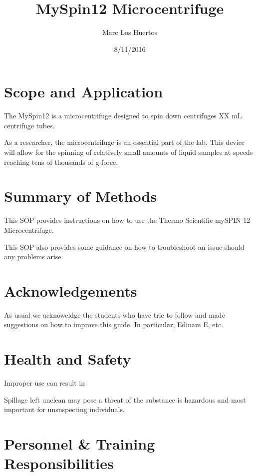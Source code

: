\documentclass[12pt]{../SOP3_beta}
\title{MySpin12 Microcentrifuge}
\date{8/11/2016}
\author{Marc Los Huertos}
\begin{document}


\maketitle

\section{Scope and Application}

\NP The MySpin12 is a microcentrifuge designed to spin down centrifuges XX mL centrifuge tubes.

\NP As a researcher, the microcentrifuge is an essential part of the lab. This device will allow for the spinning of relatively small amounts of liquid samples at speeds reaching tens of thousands of g-force. 

\section{Summary of Methods}

\NP This SOP provides instructions on how to use the Thermo Scientific mySPIN 12 Microcentrifuge. 

\NP This SOP also provides some guidance on how to troubleshoot an issue should any problems arise. 

\tableofcontents

\newpage

\section{Acknowledgements}

\NP As usual we acknoweldge the students who have trie to follow and made suggestions on how to improve this guide. In particular, Edinam E, etc.

\section{Health and Safety}

\NP Improper use can result in 

\NP Spillage left unclean may pose a threat of the substance is hazardous and most important for unsuspecting individuals.


\section{Personnel \& Training Responsibilities}
\end{document}
